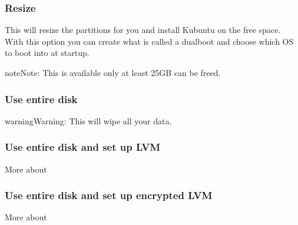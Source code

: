 \documentclass[letterpaper,10pt,english]{sphinxmanual}
\begin{document}
\subsubsection{Resize}
\label{\detokenize{docs/installation:resize}}
\sphinxAtStartPar
This will resize the partitions for you and install Kubuntu on the free space. With this option you can create what is called a dual\sphinxhyphen{}boot and choose which OS to boot into at startup.

\begin{sphinxadmonition}{note}{Note:}
\sphinxAtStartPar
This is available only at least 25GB can be freed.
\end{sphinxadmonition}


\subsubsection{Use entire disk}
\label{\detokenize{docs/installation:use-entire-disk}}

\begin{sphinxadmonition}{warning}{Warning:}
\sphinxAtStartPar
This will wipe all your data.
\end{sphinxadmonition}


\subsubsection{Use entire disk and set up LVM}
\label{\detokenize{docs/installation:use-entire-disk-and-set-up-lvm}}
\sphinxAtStartPar
More about 


\subsubsection{Use entire disk and set up encrypted LVM}
\label{\detokenize{docs/installation:use-entire-disk-and-set-up-encrypted-lvm}}
\sphinxAtStartPar
More about 
\end{document}
